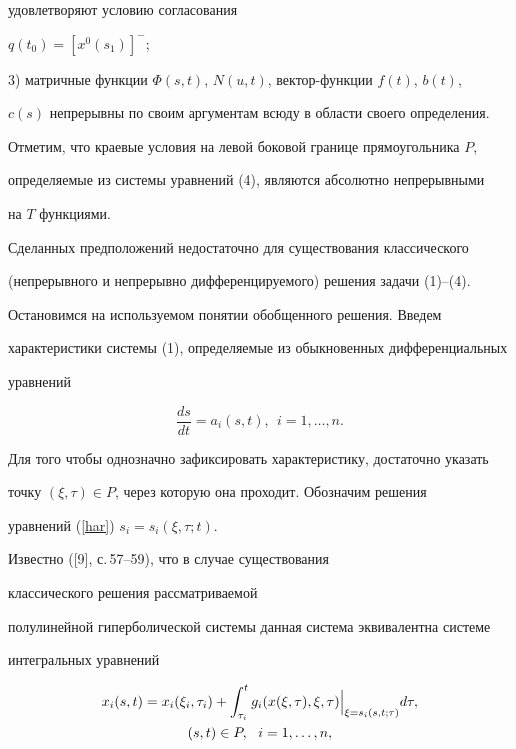 удовлетворяют условию согласования


$q(t_0)=[x^0(s_1)]^-$;





3) матричные функции $\Phi (s,t)$, $N(u,t)$, вектор-функции $f(t)$,  $b(t)$, 


$c(s)$ непрерывны по своим аргументам всюду в области своего определения.





Отметим, что краевые условия на левой боковой границе прямоугольника $P$,


определяемые из системы уравнений (4), являются абсолютно непрерывными


на $T$ функциями.





Сделанных предположений недостаточно для существования классического


(непрерывного и непрерывно дифференцируемого) решения задачи (1)--(4).


Остановимся на используемом понятии обобщенного решения. Введем 


характеристики системы (1), определяемые из обыкновенных дифференциальных


уравнений


\begin{equation}


\frac{ds}{dt}=a_i(s,t),\ \ i=1,\dotsc,n.


\label{har}


\end{equation}


Для того чтобы однозначно зафиксировать характеристику, достаточно указать


точку $(\xi,\tau)\in P$, через которую она проходит. Обозначим решения


уравнений (\ref{har}) $s_i=s_i(\xi,\tau;t).$





Известно ([9], с.\,57--59), что в случае существования


классического решения рассматриваемой


полулинейной гиперболической системы данная система эквивалентна системе


интегральных уравнений


\begin{gather}


x_i(s,t)=x_i(\xi_i,\tau_i)+\int_{\tau_i}^t 


g_i(x(\xi,\tau),\xi,\tau) \Big|_{\xi=s_i(s,t;\tau)}d\tau,


\label{ins} \\


%


(s,t)\in P,\ \ i=1,\dotsc,n,\notag


\end{gather}



